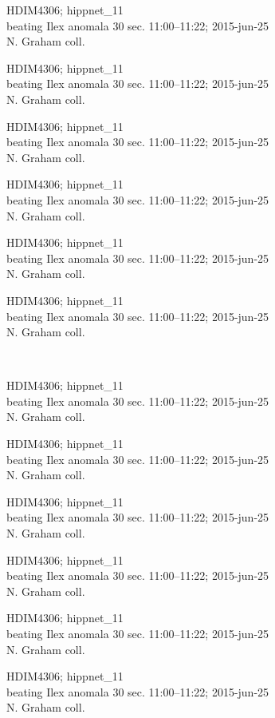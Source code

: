 \documentclass[2pt]{extarticle}
\begin{document}
\noindent
\parbox{0.16\textwidth}{\tiny \raggedright \rule[-0.3\baselineskip]{0pt}{10pt}HDIM4306; hippnet\_11\\ beating Ilex anomala 30 sec. 11:00--11:22; 2015-jun-25\\ N. Graham coll.}
\parbox{0.16\textwidth}{\tiny \raggedright \rule[-0.3\baselineskip]{0pt}{10pt}HDIM4306; hippnet\_11\\ beating Ilex anomala 30 sec. 11:00--11:22; 2015-jun-25\\ N. Graham coll.}
\parbox{0.16\textwidth}{\tiny \raggedright \rule[-0.3\baselineskip]{0pt}{10pt}HDIM4306; hippnet\_11\\ beating Ilex anomala 30 sec. 11:00--11:22; 2015-jun-25\\ N. Graham coll.}
\parbox{0.16\textwidth}{\tiny \raggedright \rule[-0.3\baselineskip]{0pt}{10pt}HDIM4306; hippnet\_11\\ beating Ilex anomala 30 sec. 11:00--11:22; 2015-jun-25\\ N. Graham coll.}
\parbox{0.16\textwidth}{\tiny \raggedright \rule[-0.3\baselineskip]{0pt}{10pt}HDIM4306; hippnet\_11\\ beating Ilex anomala 30 sec. 11:00--11:22; 2015-jun-25\\ N. Graham coll.}
\parbox{0.16\textwidth}{\tiny \raggedright \rule[-0.3\baselineskip]{0pt}{10pt}HDIM4306; hippnet\_11\\ beating Ilex anomala 30 sec. 11:00--11:22; 2015-jun-25\\ N. Graham coll.} \\ 
\vspace{0.001in} 

\noindent
\parbox{0.16\textwidth}{\tiny \raggedright \rule[-0.3\baselineskip]{0pt}{10pt}HDIM4306; hippnet\_11\\ beating Ilex anomala 30 sec. 11:00--11:22; 2015-jun-25\\ N. Graham coll.}
\parbox{0.16\textwidth}{\tiny \raggedright \rule[-0.3\baselineskip]{0pt}{10pt}HDIM4306; hippnet\_11\\ beating Ilex anomala 30 sec. 11:00--11:22; 2015-jun-25\\ N. Graham coll.}
\parbox{0.16\textwidth}{\tiny \raggedright \rule[-0.3\baselineskip]{0pt}{10pt}HDIM4306; hippnet\_11\\ beating Ilex anomala 30 sec. 11:00--11:22; 2015-jun-25\\ N. Graham coll.}
\parbox{0.16\textwidth}{\tiny \raggedright \rule[-0.3\baselineskip]{0pt}{10pt}HDIM4306; hippnet\_11\\ beating Ilex anomala 30 sec. 11:00--11:22; 2015-jun-25\\ N. Graham coll.}
\parbox{0.16\textwidth}{\tiny \raggedright \rule[-0.3\baselineskip]{0pt}{10pt}HDIM4306; hippnet\_11\\ beating Ilex anomala 30 sec. 11:00--11:22; 2015-jun-25\\ N. Graham coll.}
\parbox{0.16\textwidth}{\tiny \raggedright \rule[-0.3\baselineskip]{0pt}{10pt}HDIM4306; hippnet\_11\\ beating Ilex anomala 30 sec. 11:00--11:22; 2015-jun-25\\ N. Graham coll.} \\ 
\vspace{0.001in} 
\end{document}

